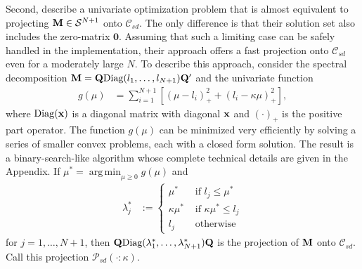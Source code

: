 \documentclass[11pt]{article}
\newcommand{\R}{\mathbb{R}}
\DeclareMathOperator*{\argmin}{arg\,min}
\theoremstyle{definition}
\theoremstyle{definition}
\def\x{{\bf x}}
\def\M{{\bf M}}
\def\Q{{\bf Q}}
\def\Diag{\text{Diag}}
\begin{document}
Second, \cite{tanaka2014positive} describe a univariate optimization problem that is almost equivalent to projecting $\M \in \mathcal{S}^{N+1}$ onto $\mathcal{C}_{sd}$. The only difference is that their solution set also includes the zero-matrix $\boldsymbol{0}$. Assuming that such a limiting case can be safely handled in the implementation, their approach offers a fast projection onto  $\mathcal{C}_{sd}$ even for a moderately large $N$. To describe this approach, consider the spectral decomposition $\M = \Q \Diag(l_1, \dots, l_{N+1}) \Q'$ and the univariate function 
\begin{align*}
g(\mu) &= \sum_{i=1}^{N+1} \left[ \left(\mu-l_i\right)^2_+ + \left(l_i - \kappa\mu\right)^2_+ \right],
\end{align*}
where $\Diag(\x)$ is a diagonal matrix with diagonal $\x$ and $(\cdot)_+$ is the positive part operator. The function $g(\mu)$ can be minimized very efficiently by solving a series of smaller convex problems, each with a closed form solution. The result is a binary-search-like algorithm whose complete technical details are given in the Appendix.
If $\mu^* = \argmin_{\mu \geq 0} g(\mu)$ and 
\begin{align*}
\lambda_j^* &:= \begin{cases}
\mu^* & \text{ if } l_j \leq \mu^*\\
\kappa \mu^* & \text{ if } \kappa \mu^*  \leq l_j\\
l_j & \text{ otherwise}
\end{cases}
\end{align*}
for $j = 1, \dots, N+1$,  then $\Q \Diag(\lambda_1^*, \dots, \lambda_{N+1}^*) \Q$ is the projection of $\M$ onto $\mathcal{C}_{sd}$. Call this projection $\mathcal{P}_{sd}(\cdot : \kappa)$. 
\end{document}
